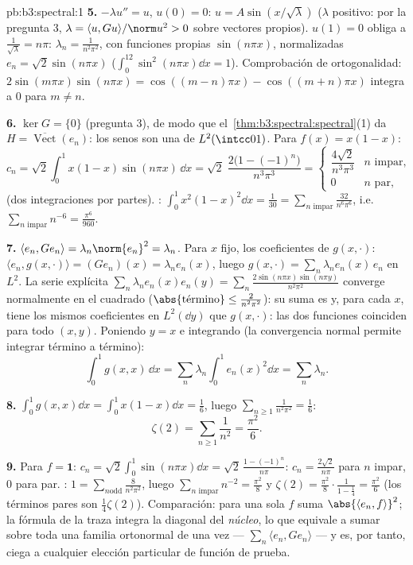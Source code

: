 \begin{solution}{pb:b3:spectral:1}
\textbf{5.} $-\lambda u'' = u$, $u(0) = 0$: $u = A\sin(x/\sqrt
\lambda)$ ($\lambda$ positivo: por la pregunta 3, $\lambda =
\langle u, Gu\rangle/\norm u^2 > 0$ sobre vectores propios). $u(1) =
0$ obliga a $\frac1{\sqrt\lambda} = n\pi$: $\lambda_n =
\frac1{n^2\pi^2}$, con funciones propias $\sin(n\pi x)$, normalizadas
$e_n = \sqrt2\sin(n\pi x)$ ($\int_0^12\sin^2(n\pi x)\dd x =
1$). Comprobación de ortogonalidad: $2\sin(m\pi x)\sin(n\pi x) =
\cos((m-n)\pi x) - \cos((m+n)\pi x)$ integra a $0$ para $m
\neq n$.

\textbf{6.} $\ker G = \{0\}$ (pregunta 3), de modo que
el~\cref{thm:b3:spectral:spectral}(1) da $H =
\overline{\operatorname{Vect}}(e_n)$: los senos son una
 de $L^2(\intcc01)$. Para
$f(x) = x(1 - x)$:
\[
c_n = \sqrt2\int_0^1x(1-x)\sin(n\pi x)\,\dd x
= \sqrt2\;\frac{2\bigl(1 - (-1)^n\bigr)}{n^3\pi^3}
= \begin{cases}\dfrac{4\sqrt2}{n^3\pi^3} & n \text{ impar},\\
0 & n \text{ par},\end{cases}
\]
(dos integraciones por partes).
: $\int_0^1x^2(1-x)^2\dd
x = \frac1{30} = \sum_{n \text{ impar}}\frac{32}{n^6\pi^6}$,
i.e.\ $\sum_{n\text{ impar}}n^{-6} = \frac{\pi^6}{960}$.

\textbf{7.} $\langle e_n, Ge_n\rangle = \lambda_n\norm{e_n}^2
= \lambda_n$. Para $x$ fijo, los coeficientes de $g(x,
\cdot)$: $\langle e_n, g(x,\cdot)\rangle = (Ge_n)(x) =
\lambda_ne_n(x)$, luego $g(x,\cdot) =
\sum_n\lambda_ne_n(x)\,e_n$ en $L^2$. La serie explícita
$\sum_n\lambda_ne_n(x)e_n(y) = \sum_n\frac{2\sin(n\pi
x)\sin(n\pi y)}{n^2\pi^2}$ converge normalmente en el cuadrado
($\abs{\text{término}} \leq \frac2{n^2\pi^2}$): su suma es
 y, para cada $x$, tiene
los mismos coeficientes en $L^2(\dd y)$ que $g(x, \cdot)$: las dos
funciones  coinciden para
todo $(x, y)$. Poniendo $y = x$ e integrando (la convergencia normal
permite integrar término a término):
\[
\int_0^1g(x,x)\,\dd x =
\sum_n\lambda_n\int_0^1e_n(x)^2\dd x = \sum_n\lambda_n .
\]

\textbf{8.} $\int_0^1g(x,x)\dd x = \int_0^1x(1 - x)\dd x =
\frac16$, luego $\sum_{n\geq1}\frac1{n^2\pi^2} = \frac16$:
\[
\zeta(2) = \sum_{n\geq1}\frac1{n^2} = \frac{\pi^2}6 .
\]

\textbf{9.} Para $f = \mathbf 1$: $c_n =
\sqrt2\int_0^1\sin(n\pi x)\dd x = \sqrt2\,\frac{1 -
(-1)^n}{n\pi}$: $c_n = \frac{2\sqrt2}{n\pi}$ para $n$ impar, $0$ para
par. : $1 = \sum_{n\text{
odd}}\frac{8}{n^2\pi^2}$, luego $\sum_{n\text{ impar}}n^{-2} =
\frac{\pi^2}8$ y $\zeta(2) = \frac{\pi^2}8\cdot\frac{1}{1
- \frac14} = \frac{\pi^2}6$ (los términos pares son $\frac14\zeta(2)$).
Comparación:  para una sola
$f$ suma $\abs{\langle e_n, f\rangle}^2$; la fórmula de la traza integra
la diagonal del \emph{núcleo}, lo que equivale a sumar
 sobre toda una familia
ortonormal de una vez --- $\sum_n\langle e_n, Ge_n\rangle$ --- y es, por
tanto, ciega a cualquier elección particular de función de prueba.


\end{solution}
